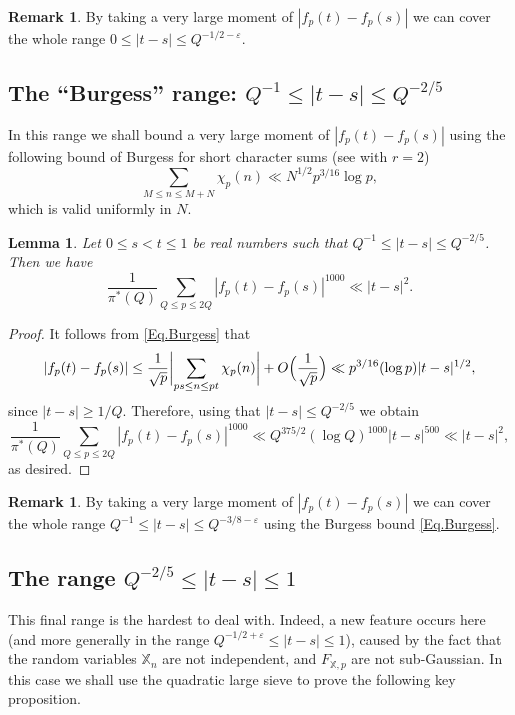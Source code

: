 \documentclass[JEP,XML,SOM,Unicode,NoFloatCountersInSection,published]{cedram}
\theoremstyle{plain}
\newtheorem{lem}[thm]{Lemma}
\theoremstyle{definition}
\newtheorem{rem}[thm]{Remark}
\let\ep\varepsilon
\newcommand{\X}{\mathbb{X}}
\begin{document}
\begin{rem}\label{Rem.Trivial}
By taking a very large moment of $|f_p(t)-f_p(s)|$ we can cover the whole range $0 \leq |t-s|\leq Q^{-1/2-\ep}$.
\end{rem}

\subsection{The ``Burgess'' range: $Q^{-1} \leq |t-s|\leq Q^{-2/5}$} In this range we shall bound a very large moment of $|f_p(t)-f_p(s)|$ using the following bound of Burgess for short character sums (see \cite[Th.\,1]{Bu} with $r=2$)
\begin{equation}\label{Eq.Burgess}
\sum_{M\leq n\leq M+N} \chi_p(n) \ll N^{1/2} p^{3/16}\log p,
\end{equation}
which is valid uniformly in $N$.
\begin{lem}\label{SecondRangeTSLemma}
Let $0\leq s<t\leq 1$ be real numbers such that $Q^{-1}\leq |t-s|\leq Q^{-2/5}$. Then we have
\[
\frac{1}{\pi^*(Q)}\sum_{Q\leq p\leq 2Q} |f_p(t)-f_p(s)|^{1000} \ll |t-s|^2.
\]
\end{lem}

\begin{proof}
It follows from \eqref{Eq.Burgess} that
\[
|f_p(t) - f_p(s)| \leq \frac{1}{\sqrt{p}}\biggl|\sum_{ps\leq n\leq pt} \chi_p(n)\biggr| +O\Bigl(\frac{1}{\sqrt{p}}\Bigr) \ll p^{3/16} (\log p) |t-s|^{1/2},\]
since $ |t-s|\geq 1/Q$.
Therefore, using that $|t-s|\leq Q^{-2/5}$ we obtain
\[
\frac{1}{\pi^*(Q)}\sum_{Q\leq p\leq 2Q} |f_p(t)-f_p(s)|^{1000} \ll Q^{375/2} (\log Q)^{1000} |t-s|^{500} \ll |t-s|^2,\]
as desired.
\end{proof}
\begin{rem}\label{Rem.Burgess}
By taking a very large moment of $|f_p(t)-f_p(s)|$ we can cover the whole range $Q^{-1} \leq |t-s|\leq Q^{-3/8-\ep}$ using the Burgess bound \eqref{Eq.Burgess}.
\end{rem}

\subsection{The range $Q^{-2/5}\leq |t-s|\leq 1$} This final range is the hardest to deal with. Indeed, a new feature occurs here (and more generally in the range \hbox{$Q^{-1/2+\varepsilon}\!\leq\! |t-s|\!\leq\!1$}), caused by the fact that the random variables $\X_n$ are not independent, and $F_{\X,p}$ are not sub-Gaussian. In this case we shall use the quadratic large sieve to prove the following key proposition.
\end{document}
